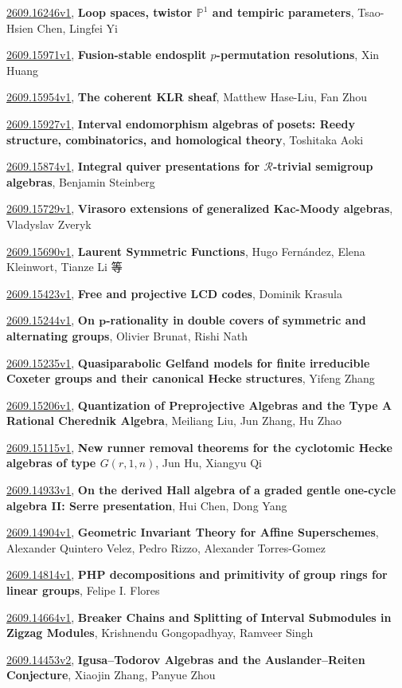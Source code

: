 \documentclass[9pt, a4paper]{article}
\theoremstyle{plain}
\theoremstyle{definition}
\theoremstyle{remark}
\newcommand{\arxiv}[3]{\href{https://arxiv.org/abs/#1}{#1}, \textbf{\textcolor{arxivblue}{#2}}, #3}
\begin{document}
\arxiv{2609.16246v1}{Loop spaces, twistor $\mathbb P^1$ and tempiric parameters}{Tsao-Hsien Chen, Lingfei Yi}

\arxiv{2609.15971v1}{Fusion-stable endosplit $p$-permutation resolutions}{Xin Huang}

\arxiv{2609.15954v1}{The coherent KLR sheaf}{Matthew Hase-Liu, Fan Zhou}

\arxiv{2609.15927v1}{Interval endomorphism algebras of posets: Reedy structure, combinatorics, and homological theory}{Toshitaka Aoki}

\arxiv{2609.15874v1}{Integral quiver presentations for $\mathscr R$-trivial semigroup algebras}{Benjamin Steinberg}

\arxiv{2609.15729v1}{Virasoro extensions of generalized Kac-Moody algebras}{Vladyslav Zveryk}

\arxiv{2609.15690v1}{Laurent Symmetric Functions}{Hugo Fernández, Elena Kleinwort, Tianze Li 等}

\arxiv{2609.15423v1}{Free and projective LCD codes}{Dominik Krasula}

\arxiv{2609.15244v1}{On $\boldsymbol{p}$-rationality in double covers of symmetric and alternating groups}{Olivier Brunat, Rishi Nath}

\arxiv{2609.15235v1}{Quasiparabolic Gelfand models for finite irreducible Coxeter groups and their canonical Hecke structures}{Yifeng Zhang}

\arxiv{2609.15206v1}{Quantization of Preprojective Algebras and the Type A Rational Cherednik Algebra}{Meiliang Liu, Jun Zhang, Hu Zhao}

\arxiv{2609.15115v1}{New runner removal theorems for the cyclotomic Hecke algebras of type $G(r,1,n)$}{Jun Hu, Xiangyu Qi}

\arxiv{2609.14933v1}{On the derived Hall algebra of a graded gentle one-cycle algebra II: Serre presentation}{Hui Chen, Dong Yang}

\arxiv{2609.14904v1}{Geometric Invariant Theory for Affine Superschemes}{Alexander Quintero Velez, Pedro Rizzo, Alexander Torres-Gomez}

\arxiv{2609.14814v1}{PHP decompositions and primitivity of group rings for linear groups}{Felipe I. Flores}

\arxiv{2609.14664v1}{Breaker Chains and Splitting of Interval Submodules in Zigzag Modules}{Krishnendu Gongopadhyay, Ramveer Singh}

\arxiv{2609.14453v2}{Igusa--Todorov Algebras and the Auslander--Reiten Conjecture}{Xiaojin Zhang, Panyue Zhou}
\end{document}
